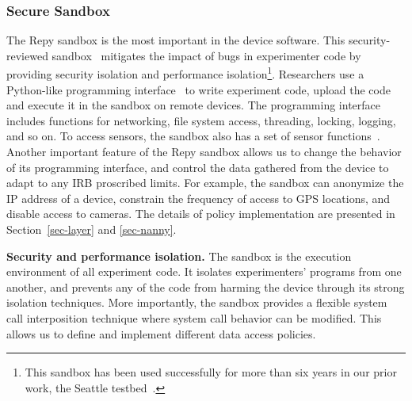 \subsubsection{Secure Sandbox} 
The Repy sandbox is the most important in the device software. This 
security-reviewed sandbox~\cite{cappos2010retaining} mitigates the 
impact of bugs in experimenter code by providing security isolation 
and performance isolation\footnote{\scriptsize 
This sandbox has been used successfully for more than six years in our 
prior work, the Seattle testbed~\cite{seattle}.}. 
Researchers use a Python-like programming interface~\cite{repyv2}
to write experiment code, upload the code and execute it in the
sandbox on remote devices. The programming interface includes functions for networking, 
file system access, threading, locking, logging, and so on. To access sensors, 
the sandbox also has a set of sensor functions~\cite{sensors}. 
%
Another important feature of the Repy sandbox allows us to change the 
behavior of its programming interface, and control the 
data gathered from the device to adapt to any IRB proscribed limits. 
For example, the sandbox can anonymize the IP address of a device, constrain  
the frequency of access to GPS locations, and disable
access to cameras. 
The details of policy implementation are presented in 
Section~\ref{sec-layer} and \ref{sec-nanny}.

\textbf{Security and performance isolation.}
The sandbox is the execution environment 
of all experiment code. It isolates experimenters' programs from one 
another, and prevents any of the code from harming the device 
through its strong isolation techniques. More importantly, the sandbox
provides a flexible system call interposition technique where system call behavior 
can be modified. This allows us to define and implement
different data access policies. 

